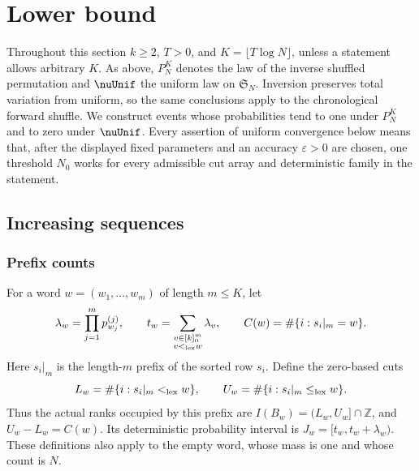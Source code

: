\section{Lower bound}\label{sec:lower-bound}\label{sec:lower}
Throughout this section $k\ge2$, $T>0$, and $K=\lfloor T\log N\rfloor$, unless a statement allows arbitrary $K$. As above, $P_N^K$ denotes the law of the inverse shuffled permutation and $\nuUnif$ the uniform law on $\mathfrak S_N$. Inversion preserves total variation from uniform, so the same conclusions apply to the chronological forward shuffle. We construct events whose probabilities tend to one under $P_N^K$ and to zero under $\nuUnif$. Every assertion of uniform convergence below means that, after the displayed fixed parameters and an accuracy $\varepsilon>0$ are chosen, one threshold $N_0$ works for every admissible cut array and deterministic family in the statement.
\subsection{Increasing sequences}\subsubsection{Prefix counts}

For a word \(w=(w_1,\ldots,w_m)\) of length \(m\le K\), let
\[
 \lambda_w=\prod_{j=1}^m p^{(j)}_{w_j},\qquad
 t_w=\sum_{\substack{v\in[k]_0^m\\v<_{\rm lex}w}}\lambda_v,
 \qquad C(w)=\#\{i:s_i|_m=w\}.
\]
Here \(s_i|_m\) is the length-\(m\) prefix of the sorted row \(s_i\).
Define the zero-based cuts
\[
 L_w=\#\{i:s_i|_m<_{\rm lex}w\},\qquad
 U_w=\#\{i:s_i|_m\le_{\rm lex}w\}.
\]
Thus the actual ranks occupied by this prefix are
\(I(B_w)=(L_w,U_w]\cap\mathbb Z\), and \(U_w-L_w=C(w)\).
Its deterministic probability interval is
\(J_w=[t_w,t_w+\lambda_w)\). These definitions also apply to the empty
word, whose mass is one and whose count is \(N\).

